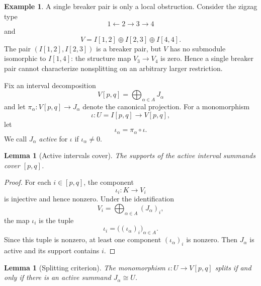 \documentclass[11pt]{amsart}
\numberwithin{equation}{section}
\newtheorem{lemma}[theorem]{Lemma}
\theoremstyle{definition}
\newtheorem{example}[theorem]{Example}
\begin{document}
\begin{example}\label{ex:single-pair-not-global}
A single breaker pair is only a local obstruction.  Consider the zigzag type
\[
1\longleftarrow2\longrightarrow3\longrightarrow4
\]
and
\[
V=I[1,2]\oplus I[2,3]\oplus I[4,4].
\]
The pair $(I[1,2],I[2,3])$ is a breaker pair, but $V$ has no submodule
isomorphic to $I[1,4]$: the structure map $V_3\to V_4$ is zero.  Hence a
single breaker pair cannot characterize nonsplitting on an arbitrary larger
restriction.
\end{example}

Fix an interval decomposition
\[
V[p,q]=\bigoplus_{\alpha\in A}J_\alpha
\]
and let $\pi_\alpha:V[p,q]\to J_\alpha$ denote the canonical projection.
For a monomorphism
\[
\iota:U=I[p,q]\longrightarrow V[p,q],
\]
let 
\[
\iota_\alpha=\pi_\alpha\circ\iota.
\]
We call $J_\alpha$ \emph{active} for $\iota$ if $\iota_\alpha\ne0$.

\begin{lemma}[Active intervals cover]\label{lem:cover}
The supports of the active interval summands cover $[p,q]$.
\end{lemma}

\begin{proof}
For each $i\in[p,q]$, the component
\[
\iota_i:K\longrightarrow V_i
\]
is injective and hence nonzero.  Under the identification
\[
V_i=\bigoplus_{\alpha\in A}(J_\alpha)_i,
\]
the map $\iota_i$ is the tuple
\[
\iota_i=\bigl((\iota_\alpha)_i\bigr)_{\alpha\in A}.
\]
Since this tuple is nonzero, at least one component
$(\iota_\alpha)_i$ is nonzero.  Then $J_\alpha$ is
active and its support contains $i$.
\end{proof}

\begin{lemma}[Splitting criterion]\label{lem:splitting}
The monomorphism $\iota:U\to V[p,q]$ splits if and only if there is an active
summand $J_\alpha\cong U$.
\end{lemma}
\end{document}
